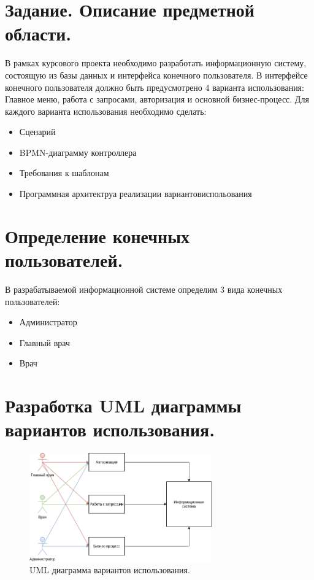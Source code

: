 \documentclass[12pt, a4paper]{article}
\begin{document}
	\section{Задание. Описание предметной области.}
	В рамках курсового проекта необходимо разработать информационную систему, состоящую
	из базы данных и интерфейса конечного пользователя. В интерфейсе конечного
	пользователя должно быть предусмотрено 4 варианта использования: Главное меню, работа
	с запросами, авторизация и основной бизнес-процесс. Для каждого варианта использования
	необходимо сделать:
	
	\begin{itemize}
		\item Сценарий
		\item BPMN-диаграмму контроллера
		\item Требования к шаблонам
		\item Программная архитектруа реализации вариантовиспольования
	\end{itemize}
	
	\section{Определение конечных пользователей.}
	В разрабатываемой информационной системе определим 3 вида конечных пользователей:
	\begin{itemize}
		\item Администратор
		\item Главный врач
		\item Врач
	\end{itemize}
    \newpage

    \section{Разработка UML диаграммы вариантов использования.}
	\begin{figure}[ht!]
		\centering    %
		\includegraphics[width=0.7\textwidth]{pictures/UML_variants_using.png}
		\caption{UML диаграмма вариантов использования.} %
		\label{fig:pic1} %
	\end{figure}
\end{document}
